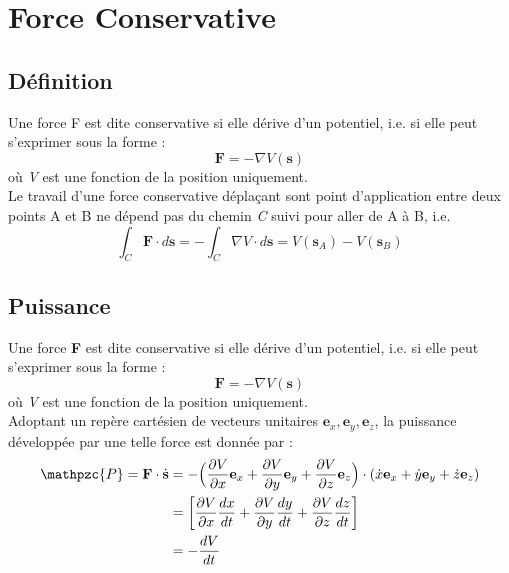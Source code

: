 \documentclass[a4paper]{article}
\begin{document}
\section{Force Conservative}





\subsection{Définition}





Une force F est dite conservative si elle dérive d’un potentiel, i.e. si elle peut s’exprimer sous la forme : 
\[ \textbf{F} = - \nabla V(\textbf{s}) \]
où \emph{V} est une fonction de la position uniquement. \\
Le travail d’une force conservative déplaçant sont point d’application entre deux points A et B ne dépend pas du chemin \emph{C} suivi pour aller de A à B, i.e.
\[ \int_C \textbf{F} \cdot d \textbf{s} = - \int_C \nabla V \cdot d \textbf{s} = V(\textbf{s}_A) - V(\textbf{s}_B) \]





\subsection{Puissance}





Une force \textbf{F} est dite conservative si elle dérive d’un potentiel, i.e. si elle peut s’exprimer sous la forme : 
\[ \textbf{F} = − \nabla V(\textbf{s}) \]
où \emph{V} est une fonction de la position uniquement. \\
Adoptant un repère cartésien de vecteurs unitaires $ \textbf{e}_x, \textbf{e}_y, \textbf{e}_z $, la puissance développée par une telle force est donnée par : 
\[ \begin{aligned}
\mathpzc{P} = \textbf{F} \cdot \dot{\textbf{s}} &= - \Big( \frac{\partial V}{\partial x} \textbf{e}_x + \frac{\partial V}{\partial y} \textbf{e}_y + \frac{\partial V}{\partial z} \textbf{e}_z \Big) \cdot (\dot{x} \textbf{e}_x + \dot{y} \textbf{e}_y + \dot{z} \textbf{e}_z) \\
&= \bigg[ \frac{\partial V}{\partial x} \frac{d x}{d t} + \frac{\partial V}{\partial y} \frac{d y}{d t} + \frac{\partial V}{\partial z} \frac{d z}{d t} \bigg] \\
&= - \frac{d V}{d t}
\end{aligned} \]
\end{document}
